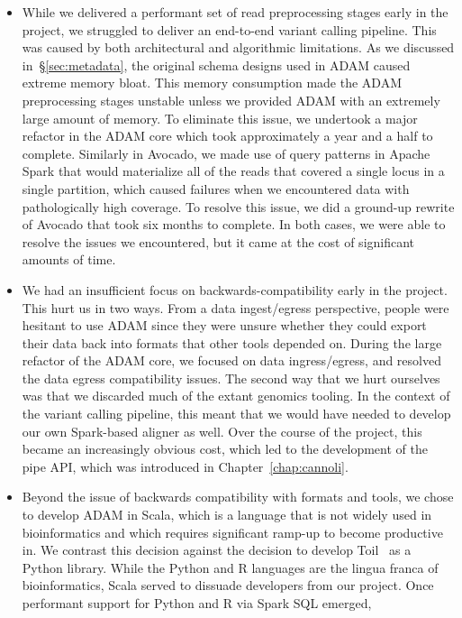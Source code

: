 \documentclass[phd]{ucbthesis}
\begin{document}
\begin{itemize}
\item While we delivered a performant set of read preprocessing stages early in
  the project, we struggled to deliver an end-to-end variant calling pipeline.
  This was caused by both architectural and algorithmic limitations. As we
  discussed in~\S\ref{sec:metadata}, the original schema designs used in ADAM
  caused extreme memory bloat. This memory consumption made the ADAM preprocessing
  stages unstable
  unless we provided ADAM with an extremely large amount of memory. To eliminate
  this issue, we undertook a major refactor in the ADAM core which took
  approximately a year and a half to complete. Similarly in Avocado, we made use
  of query patterns in Apache Spark that would materialize all of the reads that
  covered a single locus in a single partition, which caused failures when we
  encountered data with pathologically high coverage. To resolve this issue, we
  did a ground-up rewrite of Avocado that took six months to complete. In both
  cases, we were able to resolve the issues we encountered, but it came at the
  cost of significant amounts of time.
\item We had an insufficient focus on backwards-compatibility early in the
  project. This hurt us in two ways. From a data ingest/egress perspective,
  people were hesitant to use ADAM since they were unsure whether they could
  export their data back into formats that other tools depended on. During the
  large refactor of the ADAM core, we focused on data ingress/egress, and
  resolved the data egress compatibility issues. The second way that we hurt
  ourselves was that we discarded much of the extant genomics tooling. In the
  context of the variant calling pipeline, this meant that we would have needed
  to develop our own Spark-based aligner as well. Over the course of the
  project, this became an increasingly obvious cost, which led to the
  development of the pipe API, which was introduced in
  Chapter~\ref{chap:cannoli}.
\item Beyond the issue of backwards compatibility with formats and tools, we
  chose to develop ADAM in Scala, which is a language that is not widely used
  in bioinformatics and which requires significant ramp-up to become productive
  in. We contrast this decision against the decision to develop
  Toil~\cite{vivian17} as a Python library. While the Python and R languages are
  the lingua franca of bioinformatics, Scala served to dissuade developers from
  our project. Once performant support for Python and R via Spark SQL emerged,

\end{itemize}
\end{document}
